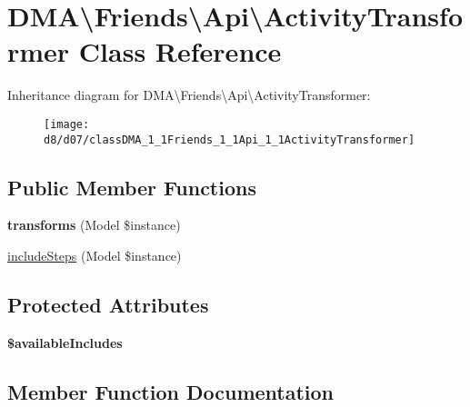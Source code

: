 \hypertarget{classDMA_1_1Friends_1_1Api_1_1ActivityTransformer}{}\section{D\+M\+A\textbackslash{}Friends\textbackslash{}Api\textbackslash{}Activity\+Transformer Class Reference}
\label{classDMA_1_1Friends_1_1Api_1_1ActivityTransformer}
Inheritance diagram for D\+M\+A\textbackslash{}Friends\textbackslash{}Api\textbackslash{}Activity\+Transformer\+:\begin{figure}[H]
\begin{center}
\leavevmode
\texttt{[image: d8/d07/classDMA\_1\_1Friends\_1\_1Api\_1\_1ActivityTransformer]}
\end{center}
\end{figure}
\subsection*{Public Member Functions}
\begin{DoxyCompactItemize}
\item 
\hypertarget{classDMA_1_1Friends_1_1Api_1_1ActivityTransformer_a7d5e972a572a1448f4d230124d0d747e}{}{\bfseries transforms} (Model \$instance)\label{classDMA_1_1Friends_1_1Api_1_1ActivityTransformer_a7d5e972a572a1448f4d230124d0d747e}

\item 
\hyperlink{classDMA_1_1Friends_1_1Api_1_1ActivityTransformer_ad840be788d75759d0c2eb9874acb9b4a}{include\+Steps} (Model \$instance)
\end{DoxyCompactItemize}
\subsection*{Protected Attributes}
\begin{DoxyCompactItemize}
\item 
{\bfseries \$available\+Includes}
\end{DoxyCompactItemize}


\subsection{Member Function Documentation}
\hypertarget{classDMA_1_1Friends_1_1Api_1_1ActivityTransformer_ad840be788d75759d0c2eb9874acb9b4a}{}
